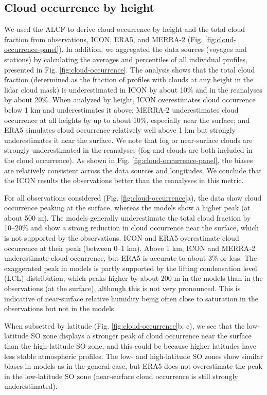 \documentclass[draft]{agujournal2019}
\begin{document}
\subsection{Cloud occurrence by height}
\label{sec:cloud-occurrence}

We used the ALCF to derive cloud occurrence by height and the total cloud fraction from observations, ICON, ERA5, and MERRA-2 (Fig. \ref{fig:cloud-occurrence-panel}). In addition, we aggregated the data sources (voyages and stations) by calculating the averages and percentiles of all individual profiles, presented in Fig. \ref{fig:cloud-occurrence}. The analysis shows that the total cloud fraction (determined as the fraction of profiles with clouds at any height in the lidar cloud mask) is underestimated in ICON by about 10\% and in the reanalyses by about 20\%. When analyzed by height, ICON overestimates cloud occurrence below 1 km and underestimates it above; MERRA-2 underestimates cloud occurrence at all heights by up to about 10\%, especially near the surface; and ERA5 simulates cloud occurrence relatively well above 1 km but strongly underestimates it near the surface. We note that fog or near-surface clouds are strongly underestimated in the reanalyses (fog and clouds are both included in the cloud occurrence). As shown in Fig. \ref{fig:cloud-occurrence-panel}, the biases are relatively consistent across the data sources and longitudes. We conclude that the ICON results the observations better than the reanalyses in this metric.

For all observations considered (Fig. \ref{fig:cloud-occurrence}a), the data show cloud occurrence peaking at the surface, whereas the models show a higher peak (at about 500 m). The models generally underestimate the total cloud fraction by 10--20\% and show a strong reduction in cloud occurrence near the surface, which is not supported by the observations. ICON and ERA5 overestimate cloud occurrence at their peak (between 0--1 km). Above 1 km, ICON and MERRA-2 underestimate cloud occurrence, but ERA5 is accurate to about 3\% or less. The exaggerated peak in models is partly supported by the lifting condensation level (LCL) distribution, which peaks higher by about 200 m in the models than in the observations (at the surface), although this is not very pronounced. This is indicative of near-surface relative humidity being often close to saturation in the observations but not in the models.

When subsetted by latitude (Fig. \ref{fig:cloud-occurrence}b, c), we see that the low-latitude SO zone displays a stronger peak of cloud occurrence near the surface than the high-latitude SO zone, and this could be because higher latitudes have less stable atmospheric profiles. The low- and high-latitude SO zones show similar biases in models as in the general case, but ERA5 does not overestimate the peak in the low-latitude SO zone (near-surface cloud occurrence is still strongly underestimated).
\end{document}
